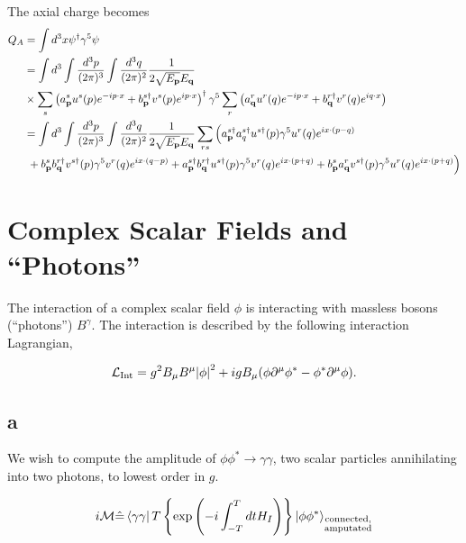 \documentclass[11pt, a4paper]{amsart}
\begin{document}
The axial charge becomes
\begin{align}
Q_A 	&= \int d^3x \psi^\dagger \gamma^5 \psi \\
 		&= \int d^3 \int \frac{d^3p}{(2\pi)^3} \int \frac{d^3q}{(2\pi)^2} \frac{1}{2\sqrt{E_{\vb{p}}} E_{\vb{q}}} \\
 		 &\times \sum_s \left(a_{\vb{p}}^su^s(p)e^{-ip\cdot x} + b_{\vb{p}}^{s\dagger}v^s(p) e^{ip\cdot x}\right)^\dagger
 		 \gamma^5
 		 			 \sum_r\left(a_{\vb{q}}^r u^r(q) e^{-ip\cdot x} + b_{\vb{q}}^{r\dagger}v^r(q)e^{iq\cdot x} \right) \nonumber \\
 		&= \int d^3 \int \frac{d^3p}{(2\pi)^3} \int \frac{d^3q}{(2\pi)^2} \frac{1}{2\sqrt{E_{\vb{p}}} E_{\vb{q}}} 
 		\sum_{rs} \Big( a_{\vb{p}}^{s\dagger}a_{q}^{s\dagger} u^{s\dagger}(p) \gamma^5 u^r(q) e^{ix\cdot (p-q)}\\
 		&\ + b_{\vb{p}}^s b_{\vb{q}}^{r\dagger}v^{s\dagger}(p) \gamma^5v^r(q)e^{ix\cdot (q-p)}
 		     + a_{\vb{p}}^{s\dagger}b_{\vb{q}}^{r\dagger} u^{s\dagger}(p) \gamma^5 v^r(q) e^{ix\cdot(p+q)}
 		     + b_{\vb{p}}^s a_{\vb{q}}^r v^{s\dagger}(p) \gamma^5 u^r(q) e^{ix\cdot (p+q)}\Big) \nonumber 
\end{align}

\section{Complex Scalar Fields and ``Photons''}

The interaction of a complex scalar field $\phi$ is interacting with massless bosons (``photons'') $B^\gamma$. The interaction is described by the following interaction Lagrangian,

\begin{equation}
\mathcal{L}_{\text{Int}} = g^2 B_\mu B^\mu \abs{\phi}^2 + ig B_\mu (\phi\partial^\mu\phi^* - \phi^* \partial^\mu \phi).
\end{equation}

\subsection{a}

We wish to compute the amplitude of $\phi\phi^* \rightarrow \gamma\gamma$, two scalar particles annihilating into two photons, to lowest order in $g$.

\begin{equation}
i\mathcal{M} \hat{=} \bra{\gamma\gamma}T\left\{\text{exp}\left(-i\int_{-T}^T dt H_I \right) \right\} \ket{\phi\phi^*}_{\substack{\text{connected,}\\ \text{amputated}}} 
\end{equation}
\end{document}
